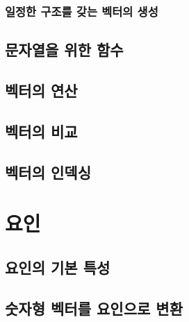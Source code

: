 \documentclass[
]{book}
\begin{document}
\hypertarget{uxc77cuxc815uxd55c-uxad6cuxc870uxb97c-uxac16uxb294-uxbca1uxd130uxc758-uxc0dduxc131}{%
\subsubsection{일정한 구조를 갖는 벡터의 생성}\label{uxc77cuxc815uxd55c-uxad6cuxc870uxb97c-uxac16uxb294-uxbca1uxd130uxc758-uxc0dduxc131}}

\hypertarget{uxbb38uxc790uxc5f4uxc744-uxc704uxd55c-uxd568uxc218}{%
\subsection{문자열을 위한 함수}\label{uxbb38uxc790uxc5f4uxc744-uxc704uxd55c-uxd568uxc218}}

\hypertarget{uxbca1uxd130uxc758-uxc5f0uxc0b0}{%
\subsection{벡터의 연산}\label{uxbca1uxd130uxc758-uxc5f0uxc0b0}}

\hypertarget{vector-compare}{%
\subsection{벡터의 비교}\label{vector-compare}}

\hypertarget{uxbca1uxd130uxc758-uxc778uxb371uxc2f1}{%
\subsection{벡터의 인덱싱}\label{uxbca1uxd130uxc758-uxc778uxb371uxc2f1}}

\hypertarget{uxc694uxc778}{%
\section{요인}\label{uxc694uxc778}}

\hypertarget{uxc694uxc778uxc758-uxae30uxbcf8-uxd2b9uxc131}{%
\subsection{요인의 기본 특성}\label{uxc694uxc778uxc758-uxae30uxbcf8-uxd2b9uxc131}}

\hypertarget{uxc22buxc790uxd615-uxbca1uxd130uxb97c-uxc694uxc778uxc73cuxb85c-uxbcc0uxd658}{%
\subsection{숫자형 벡터를 요인으로 변환}\label{uxc22buxc790uxd615-uxbca1uxd130uxb97c-uxc694uxc778uxc73cuxb85c-uxbcc0uxd658}}
\end{document}
